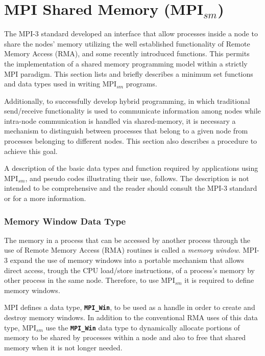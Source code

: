 \section{MPI Shared Memory (MPI$_{sm}$)}

The MPI-3 standard developed an interface that allow processes inside a node to share the nodes' memory utilizing the well established functionality of Remote Memory Access (RMA), and some recently introduced functions. This permits the implementation of a shared memory programming model within a strictly MPI paradigm. This section lists and briefly describes a minimum set functions and data types used in writing MPI$_{sm}$ programs. 
\medskip

Additionally, to successfully develop hybrid programming, in which traditional send/receive functionality is used to communicate information among nodes while intra-node communication is handled via shared-memory, it is necessary a mechanism to distinguish between processes that belong to a given node from processes belonging to different nodes. This section also describes a procedure to achieve this goal. 


\medskip

A description of the basic data types and function required by applications using MPI$_{sm}$, and pseudo codes illustrating their use, follows. The description is not intended to be comprehensive and the reader should consult the MPI-3 standard\cite{MPI-3}  or \cite{UsingAdvancedMPI} for a more information.


\medskip

\subsubsection*{Memory Window Data Type}

The memory in a process that can be accessed by another process through the use of Remote Memory Access (RMA) routines is called a \emph{memory window}. MPI-3 expand the use of memory windows into a portable mechanism that allows direct access, trough the CPU load/store instructions, of a process's memory by other process in the same node. Therefore, to use MPI$_{sm}$ it is required to define memory windows.

\medskip

MPI defines a data type, \textbf{\texttt{MPI\_Win}}, to be used as a handle in order to create and destroy memory windows. In addition to the conventional RMA uses of this data type, MPI$_{sm}$ use the \textbf{\texttt{MPI\_Win}} data type to dynamically allocate portions of memory to be shared by processes within a node and also to free that shared memory when it is not longer needed.


